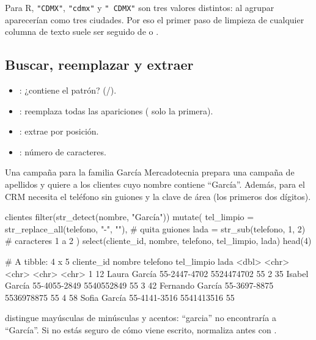 Para R, \texttt{"CDMX"}, \texttt{"cdmx"} y \texttt{" CDMX"} son tres valores
distintos: al agrupar aparecerían como tres ciudades. Por eso el primer
paso de limpieza de cualquier columna de texto suele ser
 seguido de  o
.

\subsection{Buscar, reemplazar y extraer}

\begin{itemize}
  \item {}: ¿contiene el patrón?
        (/).
  \item {}: reemplaza todas las
        apariciones ( solo la primera).
  \item {}: extrae por posición.
  \item {}: número de caracteres.
\end{itemize}

\begin{ejemplo}{Una campaña para la familia García}
Mercadotecnia prepara una campaña de apellidos y quiere a los clientes cuyo
nombre contiene ``García''. Además, para el CRM necesita el teléfono sin
guiones y la clave de área (los primeros dos dígitos).
\end{ejemplo}

\begin{rcode}
clientes %
  filter(str_detect(nombre, "García")) %
  mutate(
    tel_limpio = str_replace_all(telefono, "-", ""), # quita guiones
    lada       = str_sub(telefono, 1, 2)             # caracteres 1 a 2
  ) %
  select(cliente_id, nombre, telefono, tel_limpio, lada) %
  head(4)
\end{rcode}
\begin{rsalida}
# A tibble: 4 x 5
  cliente_id nombre          telefono     tel_limpio lada 
       <dbl> <chr>           <chr>        <chr>      <chr>
1         12 Laura García    55-2447-4702 5524474702 55   
2         35 Isabel García   55-4055-2849 5540552849 55   
3         42 Fernando García 55-3697-8875 5536978875 55   
4         58 Sofia García    55-4141-3516 5541413516 55   
\end{rsalida}

 distingue mayúsculas de minúsculas y acentos:
``garcia'' no encontraría a ``García''. Si no estás seguro de cómo viene
escrito, normaliza antes con .

